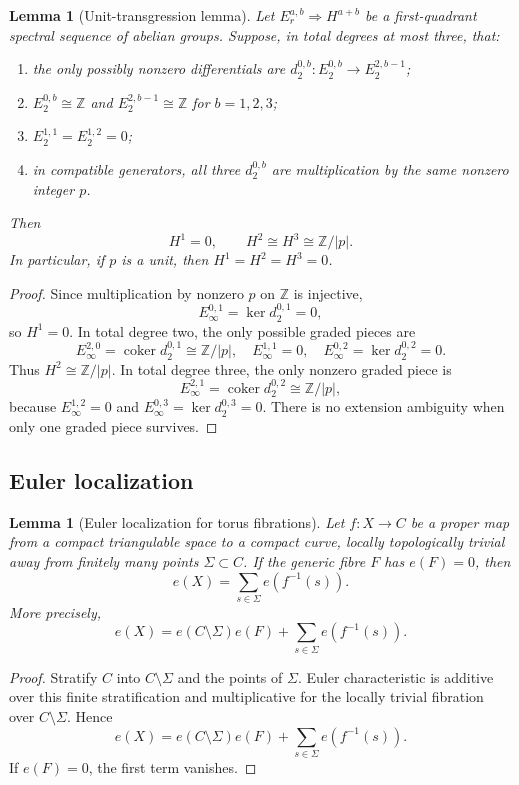 \documentclass[11pt,reqno]{amsart}
\numberwithin{equation}{section}
\newcommand{\Z}{\mathbb Z}
\newcommand{\coker}{\operatorname{coker}}
\newtheorem{lemma}[theorem]{Lemma}
\theoremstyle{definition}
\begin{document}
\begin{lemma}[Unit-transgression lemma]\label{lem:unit-transgression}
Let $E_r^{a,b}\Rightarrow H^{a+b}$ be a first-quadrant spectral sequence of abelian groups. Suppose, in total degrees at most three, that:
\begin{enumerate}
\item the only possibly nonzero differentials are $d_2^{0,b}:E_2^{0,b}\to E_2^{2,b-1}$;
\item $E_2^{0,b}\cong\Z$ and $E_2^{2,b-1}\cong\Z$ for $b=1,2,3$;
\item $E_2^{1,1}=E_2^{1,2}=0$;
\item in compatible generators, all three $d_2^{0,b}$ are multiplication by the same nonzero integer $p$.
\end{enumerate}
Then
\[
H^1=0,
\qquad
H^2\cong H^3\cong\Z/|p|.
\]
In particular, if $p$ is a unit, then $H^1=H^2=H^3=0$.
\end{lemma}

\begin{proof}
Since multiplication by nonzero $p$ on $\Z$ is injective,
\[
E_\infty^{0,1}=\ker d_2^{0,1}=0,
\]
so $H^1=0$. In total degree two, the only possible graded pieces are
\[
E_\infty^{2,0}=\coker d_2^{0,1}\cong\Z/|p|,
\quad
E_\infty^{1,1}=0,
\quad
E_\infty^{0,2}=\ker d_2^{0,2}=0.
\]
Thus $H^2\cong\Z/|p|$. In total degree three, the only nonzero graded piece is
\[
E_\infty^{2,1}=\coker d_2^{0,2}\cong\Z/|p|,
\]
because $E_\infty^{1,2}=0$ and $E_\infty^{0,3}=\ker d_2^{0,3}=0$. There is no extension ambiguity when only one graded piece survives.
\end{proof}

\subsection{Euler localization}

\begin{lemma}[Euler localization for torus fibrations]\label{lem:euler-localization}
Let $f:X\to C$ be a proper map from a compact triangulable space to a compact curve, locally topologically trivial away from finitely many points $\Sigma\subset C$. If the generic fibre $F$ has $e(F)=0$, then
\[
e(X)=\sum_{s\in\Sigma}e(f^{-1}(s)).
\]
More precisely,
\[
e(X)=e(C\setminus\Sigma)e(F)+\sum_{s\in\Sigma}e(f^{-1}(s)).
\]
\end{lemma}

\begin{proof}
Stratify $C$ into $C\setminus\Sigma$ and the points of $\Sigma$. Euler characteristic is additive over this finite stratification and multiplicative for the locally trivial fibration over $C\setminus\Sigma$. Hence
\[
e(X)=e(C\setminus\Sigma)e(F)+\sum_{s\in\Sigma}e(f^{-1}(s)).
\]
If $e(F)=0$, the first term vanishes.
\end{proof}
\end{document}
